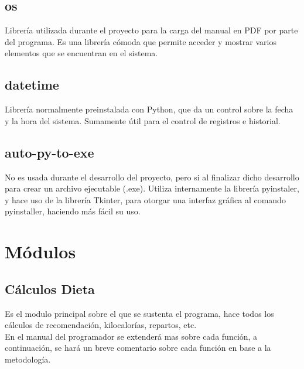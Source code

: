 \subsection{os}
Librería utilizada durante el proyecto para la carga del manual en PDF por parte del programa. Es una librería cómoda que permite acceder y mostrar varios elementos que se encuentran en el sistema.
\subsection{datetime}
Librería normalmente preinstalada con Python, que da un control sobre la fecha y la hora del sistema. Sumamente útil para el control de registros  e historial.

\subsection{auto-py-to-exe}
No es usada durante el desarrollo del proyecto, pero si al finalizar dicho desarrollo para crear un archivo ejecutable (.exe). Utiliza internamente la librería pyinstaler, y hace uso de la librería Tkinter, para otorgar una interfaz gráfica al comando pyinstaller, haciendo más fácil su uso.

\section{Módulos}
\subsection{Cálculos Dieta}
Es el modulo principal sobre el que se sustenta el programa, hace todos los cálculos de recomendación, kilocalorías, repartos, etc.\\
En el manual del programador se extenderá mas sobre cada función, a continuación, se hará un breve comentario sobre cada función en base a la metodología.
